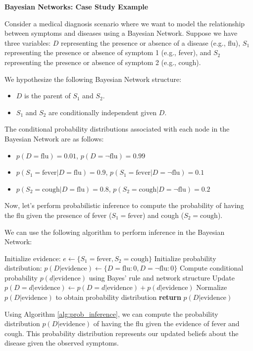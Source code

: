 \documentclass[12pt]{book} %
\begin{document}
\textbf{Bayesian Networks: Case Study Example}

Consider a medical diagnosis scenario where we want to model the relationship between symptoms and diseases using a Bayesian Network. Suppose we have three variables: $D$ representing the presence or absence of a disease (e.g., flu), $S_1$ representing the presence or absence of symptom 1 (e.g., fever), and $S_2$ representing the presence or absence of symptom 2 (e.g., cough).

We hypothesize the following Bayesian Network structure:
\begin{itemize}
    \item $D$ is the parent of $S_1$ and $S_2$.
    \item $S_1$ and $S_2$ are conditionally independent given $D$.
\end{itemize}

The conditional probability distributions associated with each node in the Bayesian Network are as follows:
\begin{itemize}
    \item $p(D = \text{flu}) = 0.01$, $p(D = \neg \text{flu}) = 0.99$
    \item $p(S_1 = \text{fever} | D = \text{flu}) = 0.9$, $p(S_1 = \text{fever} | D = \neg \text{flu}) = 0.1$
    \item $p(S_2 = \text{cough} | D = \text{flu}) = 0.8$, $p(S_2 = \text{cough} | D = \neg \text{flu}) = 0.2$
\end{itemize}

Now, let's perform probabilistic inference to compute the probability of having the flu given the presence of fever ($S_1 = \text{fever}$) and cough ($S_2 = \text{cough}$).

We can use the following algorithm to perform inference in the Bayesian Network:
\FloatBarrier
\begin{algorithm}[H]
\caption{Probabilistic Inference in Bayesian Networks}\label{alg:prob_inference}
\begin{algorithmic}[1]
\State Initialize evidence: $e \gets \{S_1 = \text{fever}, S_2 = \text{cough}\}$
\State Initialize probability distribution: $p(D|\text{evidence}) \gets \{D = \text{flu}: 0, D = \neg \text{flu}: 0\}$
    \State Compute conditional probability $p(d|\text{evidence})$ using Bayes' rule and network structure
    \State Update $p(D = d|\text{evidence}) \gets p(D = d|\text{evidence}) + p(d|\text{evidence})$
\EndFor
\State Normalize $p(D|\text{evidence})$ to obtain probability distribution
\State \textbf{return} $p(D|\text{evidence})$
\EndProcedure
\end{algorithmic}
\end{algorithm}
\FloatBarrier
Using Algorithm \ref{alg:prob_inference}, we can compute the probability distribution $p(D|\text{evidence})$ of having the flu given the evidence of fever and cough. This probability distribution represents our updated beliefs about the disease given the observed symptoms.
\end{document}
